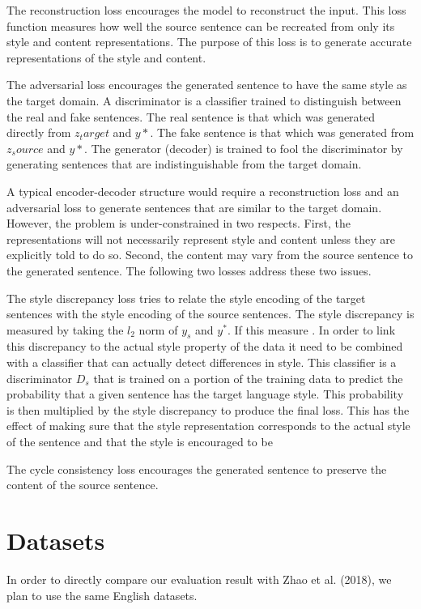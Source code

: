 \documentclass{article}
\begin{document}
The reconstruction loss encourages the model to reconstruct the input. This loss function measures how well the source sentence can be recreated from only its style and content representations. The purpose of this loss is to generate accurate representations of the style and content. 

The adversarial loss encourages the generated sentence to have the same style as the target domain. A discriminator is a classifier trained to distinguish between the real and fake sentences. The real sentence is that which was generated directly from $z_target$ and $y*$. The fake sentence is that which was generated from $z_source$ and $y*$. The generator (decoder) is trained to fool the discriminator by generating sentences that are indistinguishable from the target domain. 

A typical encoder-decoder structure would require a reconstruction loss and an adversarial loss to generate sentences that are similar to the target domain. However, the problem is under-constrained in two respects. First, the representations will not necessarily represent style and content unless they are explicitly told to do so. Second, the content may vary from the source sentence to the generated sentence. The following two losses address these two issues.

The style discrepancy loss tries to relate the style encoding of the target sentences with the style encoding of the source sentences. The style discrepancy is measured by taking the $l_2$ norm of $y_s$ and $y^*$. If this measure . In order to link this discrepancy to the actual style property of the data it need to be combined with a classifier that can actually detect differences in style. This classifier is a discriminator $D_s$ that is trained on a portion of the training data to predict the probability that a given sentence has the target language style. This probability is then multiplied by the style discrepancy to produce the final loss. This has the effect of making sure that the style representation corresponds to the actual style of the sentence and that the style is encouraged to be 

The cycle consistency loss encourages the generated sentence to preserve the content of the source sentence. 



\section{Datasets}
In order to directly compare our evaluation result with Zhao et al. (2018), we plan to use the same English datasets. 
\end{document}
